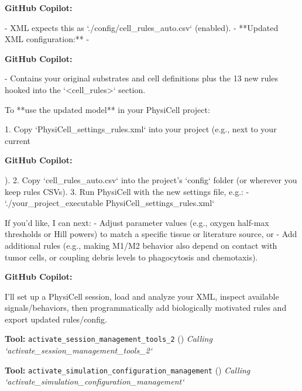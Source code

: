 \documentclass[11pt,a4paper]{article}
\begin{document}
\begin{copilotbox}
\textbf{GitHub Copilot:}

- XML expects this as `./config/cell\_rules\_auto.csv` (enabled).
- **Updated XML configuration:**  
  -

\end{copilotbox}
\begin{copilotbox}
\textbf{GitHub Copilot:}

- Contains your original substrates and cell definitions plus the 13 new rules hooked into the `<cell\_rules>` section.

To **use the updated model** in your PhysiCell project:

1. Copy `PhysiCell\_settings\_rules.xml` into your project (e.g., next to your current

\end{copilotbox}
\begin{copilotbox}
\textbf{GitHub Copilot:}

).
2. Copy `cell\_rules\_auto.csv` into the project’s `config` folder (or wherever you keep rules CSVs).
3. Run PhysiCell with the new settings file, e.g.:
   - `./your\_project\_executable PhysiCell\_settings\_rules.xml`

If you’d like, I can next:
- Adjust parameter values (e.g., oxygen half-max thresholds or Hill powers) to match a specific tissue or literature source, or
- Add additional rules (e.g., making M1/M2 behavior also depend on contact with tumor cells, or coupling debris levels to phagocytosis and chemotaxis).

\end{copilotbox}
\begin{copilotbox}
\textbf{GitHub Copilot:}

I'll set up a PhysiCell session, load and analyze your XML, inspect available signals/behaviors, then programmatically add biologically motivated rules and export updated rules/config.

\end{copilotbox}
\begin{toolokbox}
\textbf{Tool:} \texttt{activate\_session\_management\_tools\_2} (\checkmark)
\textit{Calling `activate\_session\_management\_tools\_2`}
\end{toolokbox}
\begin{toolokbox}
\textbf{Tool:} \texttt{activate\_simulation\_configuration\_management} (\checkmark)
\textit{Calling `activate\_simulation\_configuration\_management`}
\end{toolokbox}
\end{document}
